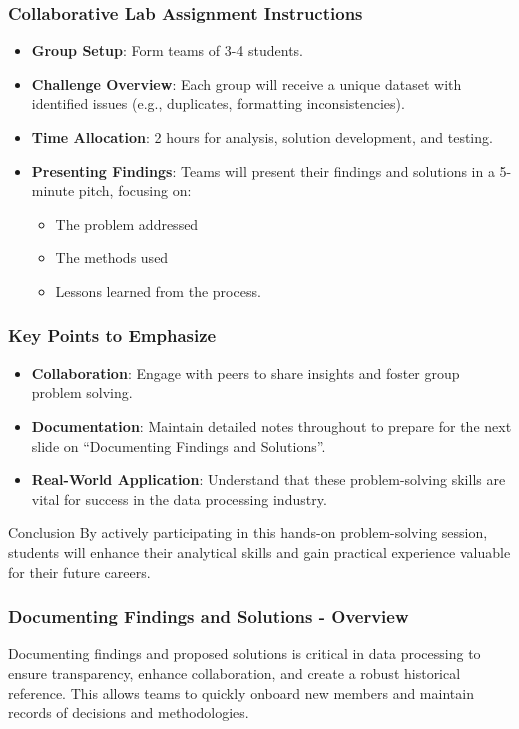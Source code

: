 \documentclass[aspectratio=169]{beamer}
\begin{document}
\begin{frame}
    \frametitle{Collaborative Lab Assignment Instructions}
    \begin{itemize}
        \item \textbf{Group Setup}: Form teams of 3-4 students.
        \item \textbf{Challenge Overview}: Each group will receive a unique dataset with identified issues (e.g., duplicates, formatting inconsistencies).
        \item \textbf{Time Allocation}: 2 hours for analysis, solution development, and testing.
        \item \textbf{Presenting Findings}: Teams will present their findings and solutions in a 5-minute pitch, focusing on:
            \begin{itemize}
                \item The problem addressed
                \item The methods used
                \item Lessons learned from the process.
            \end{itemize}
    \end{itemize}
\end{frame}

\begin{frame}
    \frametitle{Key Points to Emphasize}
    \begin{itemize}
        \item \textbf{Collaboration}: Engage with peers to share insights and foster group problem solving.
        \item \textbf{Documentation}: Maintain detailed notes throughout to prepare for the next slide on “Documenting Findings and Solutions”.
        \item \textbf{Real-World Application}: Understand that these problem-solving skills are vital for success in the data processing industry.
    \end{itemize}

    \begin{block}{Conclusion}
        By actively participating in this hands-on problem-solving session, students will enhance their analytical skills and gain practical experience valuable for their future careers.
    \end{block}
\end{frame}

\begin{frame}[fragile]
    \frametitle{Documenting Findings and Solutions - Overview}
    Documenting findings and proposed solutions is critical in data processing to ensure transparency, enhance collaboration, and create a robust historical reference. 
    This allows teams to quickly onboard new members and maintain records of decisions and methodologies.
\end{frame}
\end{document}
